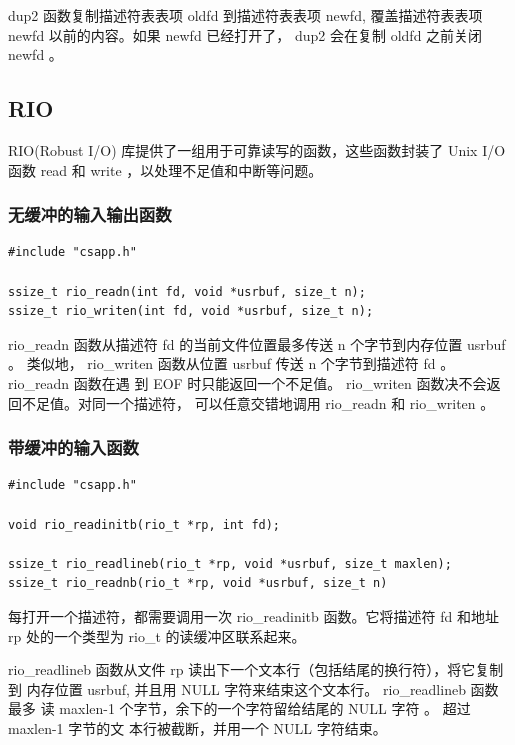 dup2 函数复制描述符表表项 oldfd 到描述符表表项 newfd, 覆盖描述符表表项 newfd 以前的内容。如果 newfd 已经打开了， dup2 会在复制 oldfd 之前关闭 newfd 。

\subsection{RIO}

RIO(Robust I/O) 库提供了一组用于可靠读写的函数，这些函数封装了 Unix I/O 函数 read 和 write ，以处理不足值和中断等问题。

\subsubsection{无缓冲的输入输出函数}

\begin{lstlisting}[style=CStyle]
#include "csapp.h"

ssize_t rio_readn(int fd, void *usrbuf, size_t n);
ssize_t rio_writen(int fd, void *usrbuf, size_t n);
\end{lstlisting}

rio\_readn 函数从描述符 fd 的当前文件位置最多传送 n 个字节到内存位置 usrbuf 。
类似地， rio\_writen 函数从位置 usrbuf 传送 n 个字节到描述符 fd 。 rio\_readn 函数在遇
到 EOF 时只能返回一个不足值。 rio\_writen 函数决不会返回不足值。对同一个描述符，
可以任意交错地调用 rio\_readn 和 rio\_writen 。

\subsubsection{带缓冲的输入函数}

\begin{lstlisting}[style=CStyle]
#include "csapp.h"

void rio_readinitb(rio_t *rp, int fd);

ssize_t rio_readlineb(rio_t *rp, void *usrbuf, size_t maxlen);
ssize_t rio_readnb(rio_t *rp, void *usrbuf, size_t n)
\end{lstlisting}

每打开一个描述符，都需要调用一次 rio\_readinitb 函数。它将描述符 fd 和地址 rp
处的一个类型为 rio\_t 的读缓冲区联系起来。

rio\_readlineb 函数从文件 rp 读出下一个文本行（包括结尾的换行符），将它复制到
内存位置 usrbuf, 并且用 NULL 字符来结束这个文本行。 rio\_readlineb 函数最多
读 maxlen-1 个字节，余下的一个字符留给结尾的 NULL 字符 。 超过 maxlen-1 字节的文
本行被截断，并用一个 NULL 字符结束。

